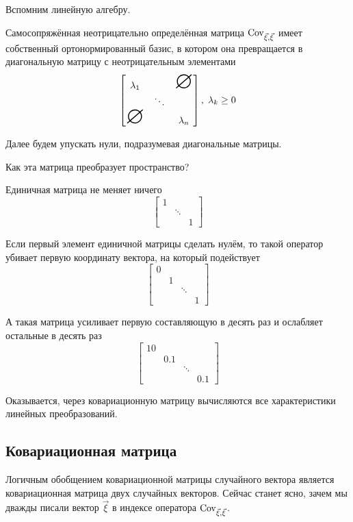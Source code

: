 \begin{remark}\label{remark:linearAlgebra:selfAdjointMatrix}
  Вспомним линейную алгебру.

  Самосопряжённая неотрицательно определённая матрица $\operatorname{Cov}^{}_{\vec{\xi}, \vec{\xi}}$ имеет
  собственный ортонормированный базис, в котором она превращается в
  диагональную матрицу с неотрицательным элементами
  $$\begin{bmatrix}
      \lambda_1 & & \mbox{\Huge{$\varnothing$}} \\
       & \ddots &  \\
       \mbox{\Huge{$\varnothing$}} & & \lambda_n
  \end{bmatrix},\; \lambda_k \ge 0$$

  Далее будем упускать нули, подразумевая диагональные матрицы.

  Как эта матрица преобразует пространство?

  Единичная матрица не меняет ничего
  $$\begin{bmatrix}
      1 & &\\
      & \ddots & \\
      & & 1
  \end{bmatrix}$$

  Если первый элемент единичной матрицы сделать нулём, то такой оператор
  убивает первую координату вектора, на который подействует
  $$\begin{bmatrix}
      0 & & & \\
      & 1 & & \\
      & & \ddots & \\
      & & & 1
  \end{bmatrix}$$

  А такая матрица усиливает первую составляющую в десять раз и
  ослабляет остальные в десять раз
  $$\begin{bmatrix}
      10 & & &\\
      & 0.1 & & \\
      & & \ddots & \\
      & & & 0.1
  \end{bmatrix}$$

  Оказывается, через ковариационную матрицу вычисляются все характеристики
  линейных преобразований.
\end{remark}

\subsection{Ковариационная матрица}
\label{section:covMatrix}
Логичным обобщением ковариационной матрицы случайного вектора является
ковариационная матрица двух случайных векторов. Сейчас станет ясно, зачем мы
дважды писали вектор $\vec{\xi}$ в индексе оператора $\operatorname{Cov}^{}_{\vec{\xi}, \vec{\xi}}$.

